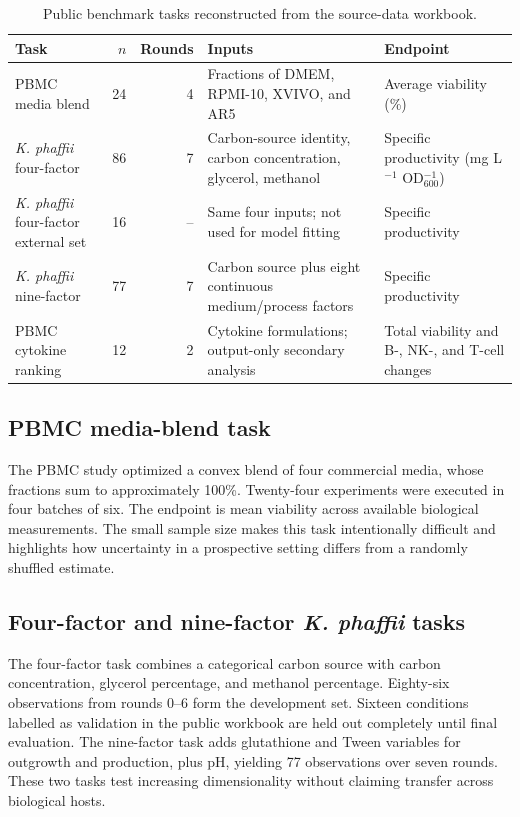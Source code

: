 \documentclass[11pt]{article}
\newcommand{\kp}{\textit{K. phaffii}}
\begin{document}
\begin{table}[ht]
\centering
\caption{Public benchmark tasks reconstructed from the source-data workbook.}
\label{tab:tasks}
\small
\begin{tabular}{p{2.5cm}rrp{3.4cm}p{3.35cm}}
\toprule
Task & $n$ & Rounds & Inputs & Endpoint \\
\midrule
PBMC media blend & 24 & 4 & Fractions of DMEM, RPMI-10, XVIVO, and AR5 & Average viability (\%) \\
\kp{} four-factor & 86 & 7 & Carbon-source identity, carbon concentration, glycerol, methanol & Specific productivity (mg L$^{-1}$ OD$_{600}^{-1}$) \\
\kp{} four-factor external set & 16 & -- & Same four inputs; not used for model fitting & Specific productivity \\
\kp{} nine-factor & 77 & 7 & Carbon source plus eight continuous medium/process factors & Specific productivity \\
PBMC cytokine ranking & 12 & 2 & Cytokine formulations; output-only secondary analysis & Total viability and B-, NK-, and T-cell changes \\
\bottomrule
\end{tabular}
\end{table}

\subsection{PBMC media-blend task}
The PBMC study optimized a convex blend of four commercial media, whose fractions sum to approximately 100\%. Twenty-four experiments were executed in four batches of six. The endpoint is mean viability across available biological measurements. The small sample size makes this task intentionally difficult and highlights how uncertainty in a prospective setting differs from a randomly shuffled estimate.

\subsection{Four-factor and nine-factor \kp{} tasks}
The four-factor task combines a categorical carbon source with carbon concentration, glycerol percentage, and methanol percentage. Eighty-six observations from rounds 0--6 form the development set. Sixteen conditions labelled as validation in the public workbook are held out completely until final evaluation. The nine-factor task adds glutathione and Tween variables for outgrowth and production, plus pH, yielding 77 observations over seven rounds. These two tasks test increasing dimensionality without claiming transfer across biological hosts.
\end{document}
